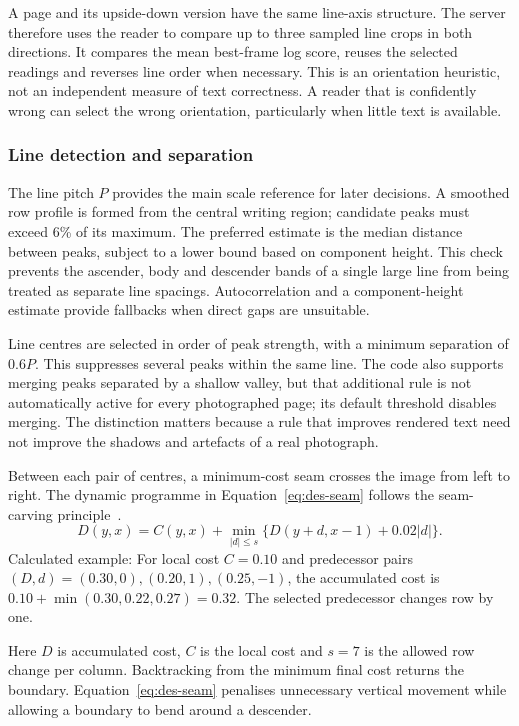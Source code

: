 A page and its upside-down version have the same line-axis structure. The server therefore uses the reader to compare up to three sampled line crops in both directions. It compares the mean best-frame log score, reuses the selected readings and reverses line order when necessary. This is an orientation heuristic, not an independent measure of text correctness. A reader that is confidently wrong can select the wrong orientation, particularly when little text is available.

\subsubsection{Line detection and separation}
The line pitch $P$ provides the main scale reference for later decisions. A smoothed row profile is formed from the central writing region; candidate peaks must exceed 6\% of its maximum. The preferred estimate is the median distance between peaks, subject to a lower bound based on component height. This check prevents the ascender, body and descender bands of a single large line from being treated as separate line spacings. Autocorrelation and a component-height estimate provide fallbacks when direct gaps are unsuitable.


Line centres are selected in order of peak strength, with a minimum separation of $0.6P$. This suppresses several peaks within the same line. The code also supports merging peaks separated by a shallow valley, but that additional rule is not automatically active for every photographed page; its default threshold disables merging. The distinction matters because a rule that improves rendered text need not improve the shadows and artefacts of a real photograph.

Between each pair of centres, a minimum-cost seam crosses the image from left to right. The dynamic programme in Equation~\ref{eq:des-seam} follows the seam-carving principle~\cite[PDF p.~3, Sec.~3]{avidan2007}.
\begin{equation}
D(y,x)=C(y,x)+\min_{|d|\leq s}
\{D(y+d,x-1)+0.02|d|\}.
\label{eq:des-seam}
\end{equation}
Calculated example: For local cost $C=0.10$ and predecessor pairs $(D,d)=(0.30,0),(0.20,1),(0.25,-1)$, the accumulated cost is $0.10+\min(0.30,0.22,0.27)=0.32$. The selected predecessor changes row by one.

Here $D$ is accumulated cost, $C$ is the local cost and $s=7$ is the allowed row change per column. Backtracking from the minimum final cost returns the boundary. Equation~\ref{eq:des-seam} penalises unnecessary vertical movement while allowing a boundary to bend around a descender.

